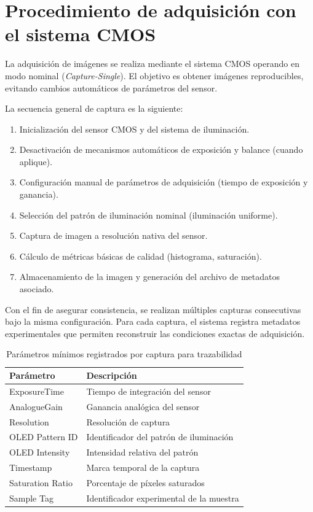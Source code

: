 \section{Procedimiento de adquisición con el sistema CMOS}

La adquisición de imágenes se realiza mediante el sistema CMOS operando en modo nominal (\textit{Capture-Single}). El objetivo es obtener imágenes reproducibles, evitando cambios automáticos de parámetros del sensor.

La secuencia general de captura es la siguiente:

\begin{enumerate}
    \item Inicialización del sensor CMOS y del sistema de iluminación.
    \item Desactivación de mecanismos automáticos de exposición y balance (cuando aplique).
    \item Configuración manual de parámetros de adquisición (tiempo de exposición y ganancia).
    \item Selección del patrón de iluminación nominal (iluminación uniforme).
    \item Captura de imagen a resolución nativa del sensor.
    \item Cálculo de métricas básicas de calidad (histograma, saturación).
    \item Almacenamiento de la imagen y generación del archivo de metadatos asociado.
\end{enumerate}

Con el fin de asegurar consistencia, se realizan múltiples capturas consecutivas bajo la misma configuración. Para cada captura, el sistema registra metadatos experimentales que permiten reconstruir las condiciones exactas de adquisición.

\begin{table}[H]
\centering
\caption{Parámetros mínimos registrados por captura para trazabilidad}
\begin{tabular}{|l|l|}
\hline
\textbf{Parámetro} & \textbf{Descripción} \\
\hline
ExposureTime & Tiempo de integración del sensor \\
AnalogueGain & Ganancia analógica del sensor \\
Resolution & Resolución de captura \\
OLED Pattern ID & Identificador del patrón de iluminación \\
OLED Intensity & Intensidad relativa del patrón \\
Timestamp & Marca temporal de la captura \\
Saturation Ratio & Porcentaje de píxeles saturados \\
Sample Tag & Identificador experimental de la muestra \\
\hline
\end{tabular}
\end{table}

